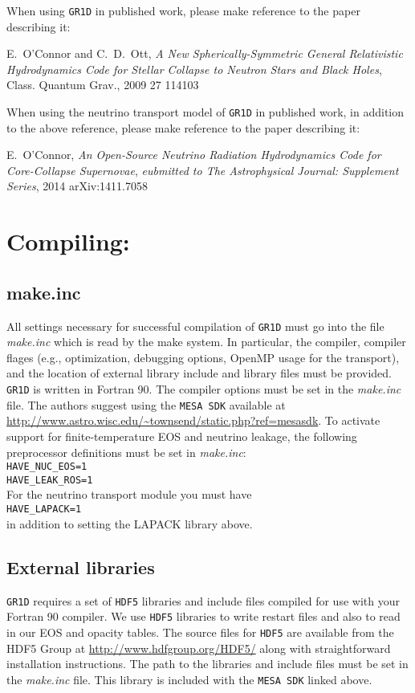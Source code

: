 \documentclass[10pt,nofootinbib]{article}
\newcommand{\code}[1]{\texttt{#1}}
\begin{document}
When using \code{GR1D} in published work, please make reference
to the paper describing it:

\hspace{2cm}\parbox{12cm}{E.\ O'Connor and C.\ D.\ Ott, \emph{A New Spherically-Symmetric
General Relativistic Hydrodynamics Code for Stellar Collapse to Neutron
Stars and Black Holes}, Class. Quantum Grav., 2009 27 114103}

When using the neutrino transport model of \code{GR1D} in published
work, in addition to the above reference, please make reference to
the paper describing it:

\hspace{2cm}\parbox{12cm}{E.\ O'Connor, \emph{An Open-Source Neutrino
    Radiation Hydrodynamics Code for Core-Collapse Supernovae},
  \emph{eubmitted to The Astrophysical Journal: Supplement Series},
  2014 arXiv:1411.7058}

\section{Compiling:}
\subsection{make.inc}
All settings necessary for successful compilation of \code{GR1D} must
go into the file {\emph{make.inc}} which is read by the make
system. In particular, the compiler, compiler flages (e.g.,
optimization, debugging options, OpenMP usage for the transport), and
the location of external library include and library files must be
provided. \code{GR1D} is written in Fortran 90.  The compiler options
must be set in the {\it make.inc} file. The authors suggest using the
\code{MESA SDK} available at
\url{http://www.astro.wisc.edu/~townsend/static.php?ref=mesasdk}.
To activate support for finite-temperature EOS and neutrino leakage,
the following preprocessor definitions must be set in \emph{make.inc}:\\
{\tt HAVE\_NUC\_EOS=1}\\
{\tt HAVE\_LEAK\_ROS=1}\\
For the neutrino transport module you must have\\
{\tt HAVE\_LAPACK=1}\\
in addition to setting the LAPACK library above.

\subsection{External libraries}
\code{GR1D} requires a set of \code{HDF5} libraries and include files
compiled for use with your Fortran 90 compiler.  We use \code{HDF5}
libraries to write restart files and also to read in our EOS and
opacity tables.  The source files for \code{HDF5} are available from
the HDF5 Group at \url{http://www.hdfgroup.org/HDF5/} along with
straightforward installation instructions.  The path to the libraries
and include files must be set in the {\it make.inc} file.  This
library is included with the \code{MESA SDK} linked above.
\end{document}
